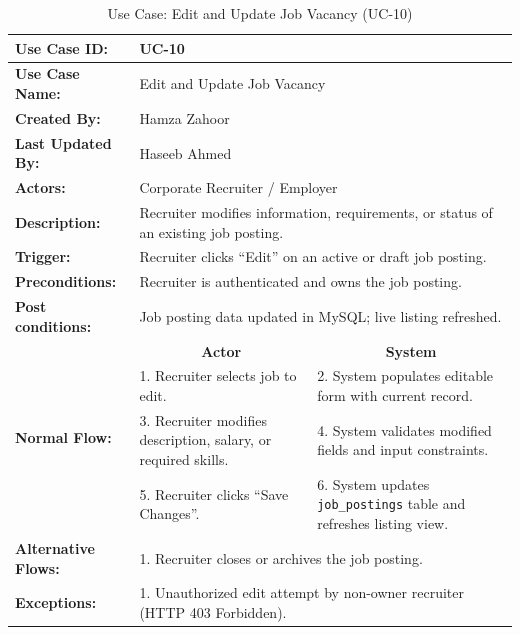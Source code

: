 \begin{table}[H]
\centering
\small
\caption{Use Case: Edit and Update Job Vacancy (UC-10)}
\label{tab:uc10_spec}
\begin{tabular}{|p{3.2cm}|p{5.5cm}|p{5.5cm}|}
\hline
\textbf{Use Case ID:} & \multicolumn{2}{p{11.4cm}|}{UC-10} \\ \hline
\textbf{Use Case Name:} & \multicolumn{2}{p{11.4cm}|}{Edit and Update Job Vacancy} \\ \hline
\textbf{Created By:} & \multicolumn{2}{p{11.4cm}|}{Hamza Zahoor} \\ \hline
\textbf{Last Updated By:} & \multicolumn{2}{p{11.4cm}|}{Haseeb Ahmed} \\ \hline
\textbf{Actors:} & \multicolumn{2}{p{11.4cm}|}{Corporate Recruiter / Employer} \\ \hline
\textbf{Description:} & \multicolumn{2}{p{11.4cm}|}{Recruiter modifies information, requirements, or status of an existing job posting.} \\ \hline
\textbf{Trigger:} & \multicolumn{2}{p{11.4cm}|}{Recruiter clicks ``Edit'' on an active or draft job posting.} \\ \hline
\textbf{Preconditions:} & \multicolumn{2}{p{11.4cm}|}{Recruiter is authenticated and owns the job posting.} \\ \hline
\textbf{Post conditions:} & \multicolumn{2}{p{11.4cm}|}{Job posting data updated in MySQL; live listing refreshed.} \\ \hline
\multirow{4}{*}{\textbf{Normal Flow:}} & \multicolumn{1}{c|}{\textbf{Actor}} & \multicolumn{1}{c|}{\textbf{System}} \\ \cline{2-3}
& 1. Recruiter selects job to edit. & 2. System populates editable form with current record. \vspace{2pt} \\
& 3. Recruiter modifies description, salary, or required skills. & 4. System validates modified fields and input constraints. \vspace{2pt} \\
& 5. Recruiter clicks ``Save Changes''. & 6. System updates \texttt{job\_postings} table and refreshes listing view. \\ \hline
\textbf{Alternative Flows:} & \multicolumn{2}{p{11.4cm}|}{1. Recruiter closes or archives the job posting.} \\ \hline
\textbf{Exceptions:} & \multicolumn{2}{p{11.4cm}|}{1. Unauthorized edit attempt by non-owner recruiter (HTTP 403 Forbidden).} \\ \hline
\end{tabular}
\end{table}

